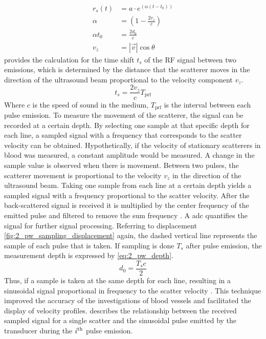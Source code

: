 \begin{subequations}
	\begin{align}
		r_{s}(t) &= a\cdot e^{\left( \alpha \left( t-t_{0} \right) \right)} \label{eq:2_pw_receive_signal_a} \\
		\alpha &= \left( 1- \frac{2v_{z}}{c} \right) \label{eq:2_pw_receive_signal_b} \\
		\alpha t_{0} &= \frac{2d_{0}}{c} \label{eq:2_pw_receive_signal_c} \\
		v_{z} &= \left| \vec{v} \right| \cos \theta \label{eq:2_pw_receive_signal_d}
	\end{align}
\end{subequations}
 provides the calculation for the time shift $t_{s}$ of the RF signal between two emissions, which is determined by the distance that the scatterer moves in the direction of the ultrasound beam proportional to the velocity component $v_{z}$.
\begin{equation} \label{eq:2_pw_ts_time_shift}
	t_{s} = \frac{2v_{z}}{c} T_{\mathrm{prf}}
\end{equation}
Where $c$ is the speed of sound in the medium, $T_{\mathrm{prf}}$ is the interval between each pulse emission. To measure the movement of the scatterer, the signal can be recorded at a certain depth. By selecting one sample at that specific depth for each line, a sampled signal with a frequency that corresponds to the scatter velocity can be obtained. Hypothetically, if the velocity of stationary scatterers in blood was measured, a constant amplitude would be measured. A change in the sample value is observed when there is movement. Between two pulses, the scatterer movement is proportional to the velocity $v_{z}$ in the direction of the ultrasound beam. Taking one sample from each line at a certain depth yields a sampled signal with a frequency proportional to the scatter velocity. After the back-scattered signal is received it is multiplied by the center frequency of the emitted pulse and filtered to remove the sum frequency \cite{JensenUltrasoundBook}. A \gls{adc} quantifies the signal for further signal processing. Referring to displacement \cref{fig:2_pw_sampling_displacement} again, the dashed vertical line represents the sample of each pulse that is taken. If sampling is done $T_{s}$ after pulse emission, the measurement depth is expressed by \cref{eq:2_pw_depth}.
\begin{equation} \label{eq:2_pw_depth}
	d_{0} = \frac{T_{s}c}{2}
\end{equation}
Thus, if a sample is taken at the same depth for each line, resulting in a sinusoidal signal proportional in frequency to the scatter velocity \cite{Munk_Thesis}. This technique improved the accuracy of the investigations of blood vessels and facilitated the display of velocity profiles.  describes the relationship between the received sampled signal for a single scatter and the sinusoidal pulse emitted by the transducer during the $i\textsuperscript{th}$ pulse emission.
